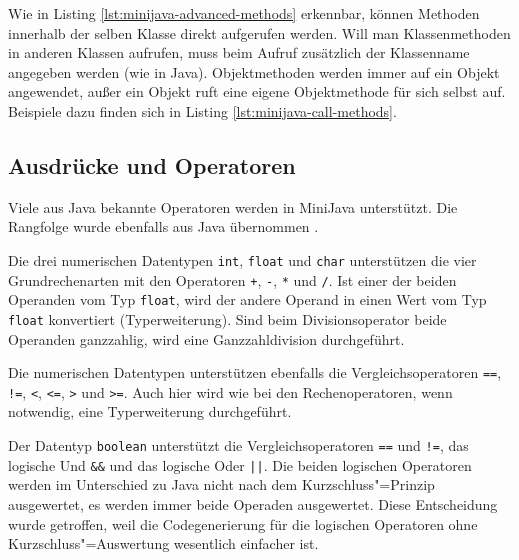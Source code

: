\pagebreak


Wie in Listing \ref{lst:minijava-advanced-methods} erkennbar, können Methoden innerhalb der selben Klasse direkt aufgerufen werden. Will man Klassenmethoden in anderen Klassen aufrufen, muss beim Aufruf zusätzlich der Klassenname angegeben werden (wie in Java). Objektmethoden werden immer auf ein Objekt angewendet, außer ein Objekt ruft eine eigene Objektmethode für sich selbst auf. Beispiele dazu finden sich in Listing \ref{lst:minijava-call-methods}.



\subsection{Ausdrücke und Operatoren}

Viele aus Java bekannte Operatoren werden in MiniJava unterstützt. Die Rangfolge wurde ebenfalls aus Java übernommen \cite{JavaOperators}.

Die drei numerischen Datentypen \lstinline{int}, \lstinline{float} und \lstinline{char} unterstützen die vier Grundrechenarten mit den Operatoren \lstinline{+}, \lstinline{-}, \lstinline{*} und \lstinline{/}. Ist einer der beiden Operanden vom Typ \lstinline{float}, wird der andere Operand in einen Wert vom Typ \lstinline{float} konvertiert (Typerweiterung). Sind beim Divisionsoperator beide Operanden ganzzahlig, wird eine Ganzzahldivision durchgeführt.

Die numerischen Datentypen unterstützen ebenfalls die Vergleichsoperatoren \lstinline{==}, \lstinline{!=}, \mbox{\lstinline{<},} \lstinline{<=}, \lstinline{>} und \lstinline{>=}. Auch hier wird wie bei den Rechenoperatoren, wenn notwendig, eine Typerweiterung durchgeführt.

Der Datentyp \lstinline{boolean} unterstützt die Vergleichsoperatoren \lstinline{==} und \lstinline{!=}, das logische Und \lstinline{&&} und das logische Oder \lstinline{||}. Die beiden logischen Operatoren werden im Unterschied zu Java nicht nach dem Kurzschluss"=Prinzip ausgewertet, es werden immer beide Operaden ausgewertet. Diese Entscheidung wurde getroffen, weil die Codegenerierung für die logischen Operatoren ohne Kurzschluss"=Auswertung wesentlich einfacher ist.


